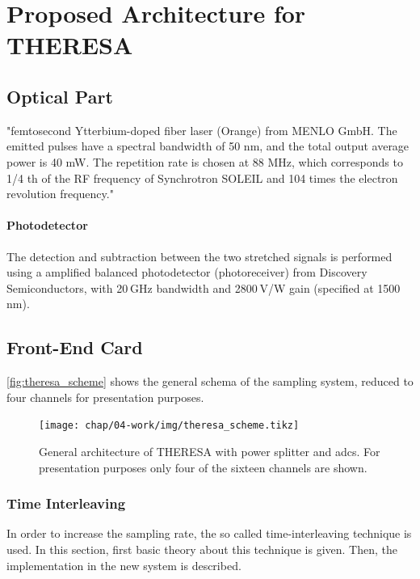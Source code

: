 \section{Proposed Architecture for THERESA}
\subsection*{Optical Part}
"femtosecond Ytterbium-doped fiber laser (Orange) from MENLO GmbH. The emitted pulses have a spectral bandwidth of 50 nm, and the total
output average power is 40 mW. The repetition rate is chosen at 88 MHz, which corresponds to 1/4 th of
the RF frequency of Synchrotron SOLEIL and 104 times the electron revolution frequency."

\paragraph{Photodetector}
The detection and subtraction between the two stretched signals is performed using a amplified balanced photodetector (photoreceiver) from Discovery Semiconductors, with 20 GHz bandwidth and 2800 V/W gain (specified at 1500 nm).

\subsection*{Front-End Card}
\autoref{fig:theresa_scheme} shows the general schema of the sampling system, reduced to four channels for presentation purposes.
\begin{figure}[H]
	\centering
	\texttt{[image: chap/04-work/img/theresa\_scheme.tikz]}
	\caption[General architecture of THERESA]{General architecture of THERESA with power splitter and \glspl{adc}. For presentation purposes only four of the sixteen channels are shown.}
	\label{fig:theresa_scheme}
\end{figure}

\subsubsection*{Time Interleaving}\label{sssec:time-interleaving}
In order to increase the sampling rate, the so called time-interleaving technique is used. In this section, first basic theory about this technique is given. Then, the implementation in the new system is described.


